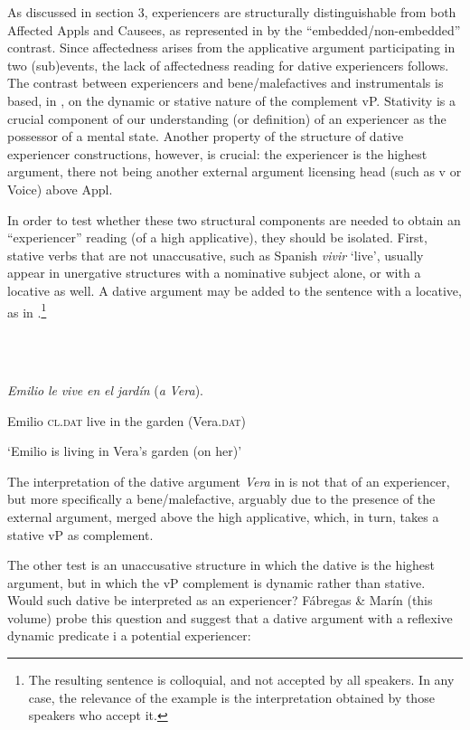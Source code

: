 \documentclass[output=paper,modfonts,nonflat]{langsci/langscibook}
\begin{document}
As discussed in section 3, experiencers are structurally distinguishable from both Affected Appls and Causees, as represented in  by the “embedded/non-embedded” contrast. Since affectedness arises from the applicative argument participating in two (sub)events, the lack of affectedness reading for dative experiencers follows. The contrast between experiencers and bene/malefactives and instrumentals is based, in , on the dynamic or stative nature of the complement vP. Stativity is a crucial component of our understanding (or definition) of an experiencer as the possessor of a mental state. Another property of the structure of dative experiencer constructions, however, is crucial: the experiencer is the highest argument, there not being another external argument licensing head (such as v or Voice) above Appl. 

In order to test whether these two structural components are needed to obtain an “experiencer” reading (of a high applicative), they should be isolated. First, stative verbs that are not unaccusative, such as Spanish \textit{vivir} ‘live’, usually appear in unergative structures with a nominative subject alone, or with a locative as well. A dative argument may be added to the sentence with a locative, as in .\footnote{The resulting sentence is colloquial, and not accepted by all speakers. In any case, the relevance of the example is the interpretation obtained by those speakers who accept it.} 

\ea%
    \label{ex:key:20}
    \gll\\
        \\
    \glt
    \z

          \textit{Emilio} \textit{le} \textit{vive} \textit{en} \textit{el} \textit{jardín} (\textit{a} \textit{Vera}). 

  Emilio \textsc{cl.dat}   live in the garden (Vera.\textsc{dat)}

  ‘Emilio is living in Vera’s garden (on her)’

The interpretation of the dative argument \textit{Vera} in  is not that of an experiencer, but more specifically a bene/malefactive, arguably due to the presence of the external argument, merged above the high applicative, which, in turn, takes a stative vP as complement. 

The other test is an unaccusative structure in which the dative is the highest argument, but in which the vP complement is dynamic rather than stative. Would such dative be interpreted as an experiencer?  Fábregas \& Marín (this volume) probe this question and suggest that a dative argument with a reflexive dynamic predicate i a potential experiencer:
\end{document}
